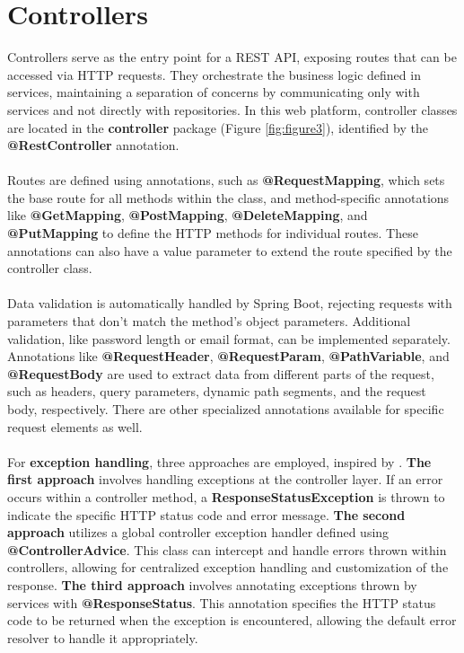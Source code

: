 \section{Controllers}

Controllers serve as the entry point for a REST API, exposing routes that can be accessed via HTTP requests. They orchestrate the business logic defined in services, maintaining a separation of concerns by communicating only with services and not directly with repositories. In this web platform, controller classes are located in the \textbf{controller} package (Figure \ref{fig:figure3}), identified by the \textbf{@RestController} annotation.
\\\\
\noindent Routes are defined using annotations, such as \textbf{@RequestMapping}, which sets the base route for all methods within the class, and method-specific annotations like \textbf{@GetMapping}, \textbf{@PostMapping}, \textbf{@DeleteMapping}, and \textbf{@PutMapping} to define the HTTP methods for individual routes. These annotations can also have a value parameter to extend the route specified by the controller class.
\\\\
\noindent Data validation is automatically handled by Spring Boot, rejecting requests with parameters that don't match the method's object parameters. Additional validation, like password length or email format, can be implemented separately. Annotations like \textbf{@RequestHeader}, \textbf{@RequestParam}, \textbf{@PathVariable}, and \textbf{@RequestBody} are used to extract data from different parts of the request, such as headers, query parameters, dynamic path segments, and the request body, respectively. There are other specialized annotations available for specific request elements as well.
\\\\
\noindent For \textbf{exception handling}, three approaches are employed, inspired by \cite{baeldung-spring-exceptions}. \textbf{The first approach} involves handling exceptions at the controller layer. If an error occurs within a controller method, a \textbf{ResponseStatusException} is thrown to indicate the specific HTTP status code and error message. \textbf{The second approach} utilizes a global controller exception handler defined using \textbf{@ControllerAdvice}. This class can intercept and handle errors thrown within controllers, allowing for centralized exception handling and customization of the response. \textbf{The third approach} involves annotating exceptions thrown by services with \textbf{@ResponseStatus}. This annotation specifies the HTTP status code to be returned when the exception is encountered, allowing the default error resolver to handle it appropriately.

